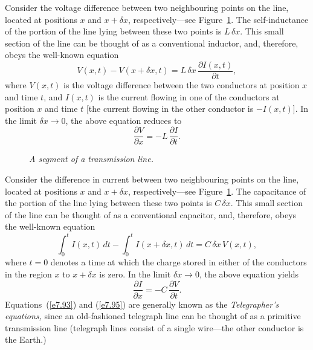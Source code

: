 Consider the voltage difference between two neighbouring points
on the line, located at positions $x$ and $x+\delta x$, respectively---see Figure~\ref{ftrans}.
The self-inductance of the portion of the line lying between these two
points is $L\,\delta x$. This small section of the line can be thought of as
a conventional inductor, and, therefore, obeys the well-known equation
\begin{equation}
V(x, t) -V(x+\delta x, t) =  L\,\delta x\,\frac{\partial I(x, t)}{\partial t},
\end{equation}
where $V(x, t)$ is the voltage difference between the two conductors at
position $x$ and time $t$, and 
$I(x, t)$ is the current flowing in one of the conductors at position
$x$ and time $t$ [the current flowing
in the other conductor is $-I(x, t)$]. In the limit $\delta x\rightarrow 0$,
the above equation reduces to
\begin{equation}\label{e7.93}
\frac{\partial V}{\partial x} = - L\,\frac{\partial I}{\partial t}.
\end{equation}
\begin{figure}
\centerline{}
\caption{\em A segment of a transmission line.}\label{ftrans}
\end{figure}

Consider the difference in current between two neighbouring points on the
line, located at positions $x$ and $x+\delta x$, respectively---see Figure~\ref{ftrans}. The capacitance
of the portion of the line lying between these two points is
$C\,\delta x$. This small section of the line can be thought of
as a conventional capacitor, and, therefore, obeys the well-known equation
\begin{equation}
\int_0^t I(x, t)\,dt - \int_0^t I(x+\delta x, t)\,dt =  C\,\delta x\,V(x,t),
\end{equation}
where $t=0$ denotes a time at which the charge stored in either  of
the conductors in the region $x$ to
$x+\delta x$ is zero. In the limit $\delta x \rightarrow 0$, the above equation
yields
\begin{equation}\label{e7.95}
\frac{\partial I}{\partial x} = - C\,\frac{\partial V}{\partial t}.
\end{equation}
Equations~(\ref{e7.93}) and (\ref{e7.95}) are generally known as the {\em Telegrapher's equations,}
since an old-fashioned telegraph line can be thought of as a primitive
transmission line (telegraph lines consist of a single wire---the other conductor
is the Earth.) 

